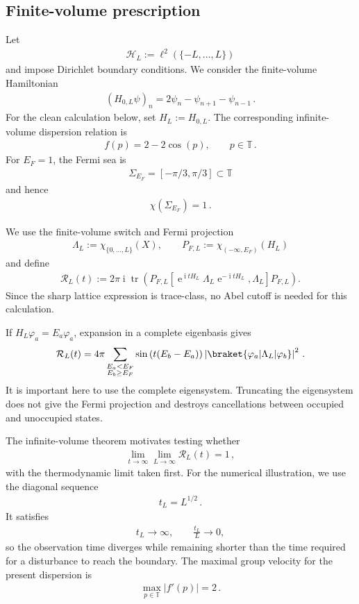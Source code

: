 \documentclass[a4paper,10pt]{article}
\numberwithin{equation}{section}
\theoremstyle{plain}
\theoremstyle{plain}
\theoremstyle{plain}
\theoremstyle{plain}
\theoremstyle{plain}
\theoremstyle{remark}
\theoremstyle{definition}
\theoremstyle{plain}
\newcommand{\ee}{\operatorname{e}}
\newcommand{\ii}{\operatorname{i}}
\newcommand{\TT}{\mathbb{T}}
\newcommand{\calR}{\mathcal{R}}
\newcommand{\calH}{\mathcal{H}}
\newcommand{\tr}{\operatorname{tr}}
\newcommand{\eq}[1]{\begin{align*}#1\end{align*}}
\newcommand{\eql}[1]{\begin{align}#1\end{align}}
\begin{document}
\subsection{Finite-volume prescription}

Let
\eq{\calH_L:=\ell^2(\{-L,\ldots,L\})}
and impose Dirichlet boundary conditions. We consider the finite-volume
Hamiltonian
\eq{(H_{0,L}\psi)_n
=2\psi_n-\psi_{n+1}-\psi_{n-1}\,.}
For the clean calculation below, set $H_L:=H_{0,L}$.
The corresponding infinite-volume dispersion relation is
\eq{f(p)=2-2\cos(p),\qquad p\in\TT\,.}
For $E_F=1$, the Fermi sea is
\eq{\Sigma_{E_F}=[-\pi/3,\pi/3]\subset\TT}
and hence
\eq{\chi(\Sigma_{E_F})=1\,.}

We use the finite-volume switch and Fermi projection
\eq{\Lambda_L:=\chi_{\{0,\ldots,L\}}(X),
\qquad
P_{F,L}:=\chi_{(-\infty,E_F)}(H_L)}
and define
\eql{\calR_L(t):=
2\pi\ii\tr\left(
P_{F,L}\left[
\ee^{\ii tH_L}\Lambda_L\ee^{-\ii tH_L},
\Lambda_L
\right]P_{F,L}
\right).
\label{eq:finite-volume numerical response}}
Since the sharp lattice expression is trace-class, no Abel cutoff is needed
for this calculation.

If $H_L\varphi_a=E_a\varphi_a$, expansion in a complete eigenbasis gives
\eq{\calR_L(t)
=
4\pi
\sum_{\substack{E_a<E_F\\E_b\geq E_F}}
\sin\left(t(E_b-E_a)\right)
\left|\braket{\varphi_a|\Lambda_L|\varphi_b}\right|^2\,.}
It is important here to use the complete eigensystem. Truncating the
eigensystem does not give the Fermi projection and destroys cancellations
between occupied and unoccupied states.

The infinite-volume theorem motivates testing whether
\eq{\lim_{t\to\infty}\lim_{L\to\infty}\calR_L(t)=1\,,}
with the thermodynamic limit taken first. For the numerical illustration,
we use the diagonal sequence
\eq{t_L=L^{1/2}\,.}
It satisfies
\eq{t_L\to\infty,\qquad \frac{t_L}{L}\to0,}
so the observation time diverges while remaining shorter than the time
required for a disturbance to reach the boundary. The maximal group velocity
for the present dispersion is
\eq{\max_{p\in\TT}|f'(p)|=2\,.}
\end{document}
